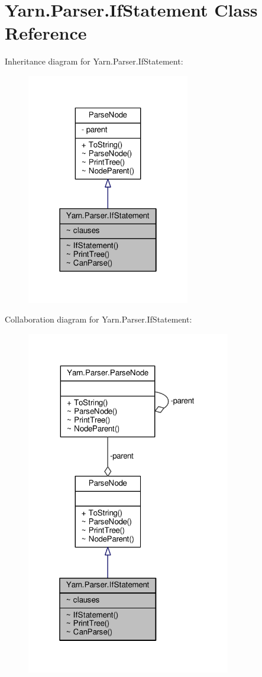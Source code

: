 \hypertarget{a00043}{\section{Yarn.\-Parser.\-If\-Statement Class Reference}
\label{a00043}
}


Inheritance diagram for Yarn.\-Parser.\-If\-Statement\-:
\nopagebreak
\begin{figure}[H]
\begin{center}
\leavevmode
\includegraphics[width=202pt]{a00267}
\end{center}
\end{figure}


Collaboration diagram for Yarn.\-Parser.\-If\-Statement\-:
\nopagebreak
\begin{figure}[H]
\begin{center}
\leavevmode
\includegraphics[width=253pt]{a00268}
\end{center}
\end{figure}
